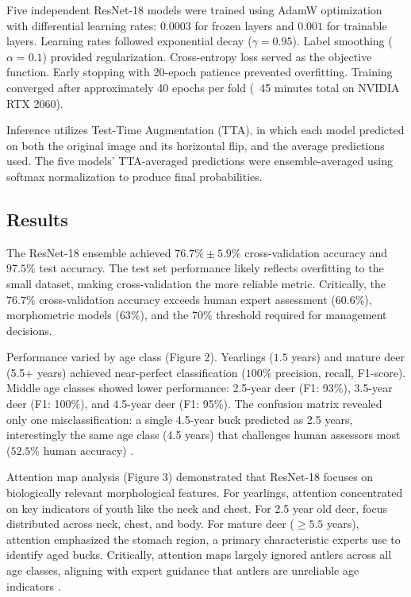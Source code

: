 \documentclass{iopjournal}
\begin{document}
Five independent ResNet-18 models were trained using AdamW optimization with differential learning rates: $0.0003$ for frozen layers and $0.001$ for trainable layers. Learning rates followed exponential decay ($\gamma=0.95$). Label smoothing ($\alpha=0.1$) provided regularization. Cross-entropy loss served as the objective function. Early stopping with 20-epoch patience prevented overfitting. Training converged after approximately 40 epochs per fold (~45 minutes total on NVIDIA RTX 2060).

Inference utilizes Test-Time Augmentation (TTA), in which each model predicted on both the original image and its horizontal flip, and the average predictions used. The five models' TTA-averaged predictions were ensemble-averaged using softmax normalization to produce final probabilities.

\subsection{Results}

The ResNet-18 ensemble achieved $76.7\% \pm 5.9\%$ cross-validation accuracy and $97.5\%$ test accuracy. The test set performance likely reflects overfitting to the small dataset, making cross-validation the more reliable metric. Critically, the $76.7\%$ cross-validation accuracy exceeds human expert assessment ($60.6\%$), morphometric models ($63\%$), and the $70\%$ threshold required for management decisions.

Performance varied by age class (Figure 2). Yearlings ($1.5$ years) and mature deer (5.5+ years) achieved near-perfect classification ($100\%$ precision, recall, F1-score). Middle age classes showed lower performance: 2.5-year deer (F1: 93\%), 3.5-year deer (F1: 100\%), and 4.5-year deer (F1: 95\%). The confusion matrix revealed only one misclassification: a single 4.5-year buck predicted as 2.5 years, interestingly the same age class (4.5 years) that challenges human assessors most ($52.5\%$ human accuracy) \cite{2013gee}.

Attention map analysis (Figure 3) demonstrated that ResNet-18 focuses on biologically relevant morphological features. For yearlings, attention concentrated on key indicators of youth like the neck and chest. For 2.5 year old deer, focus distributed across neck, chest, and body. For mature deer ($\geq5.5$ years), attention emphasized the stomach region, a primary characteristic experts use to identify aged bucks. Critically, attention maps largely ignored antlers across all age classes, aligning with expert guidance that antlers are unreliable age indicators \cite{1999demarais, 2003richards}.
\end{document}
